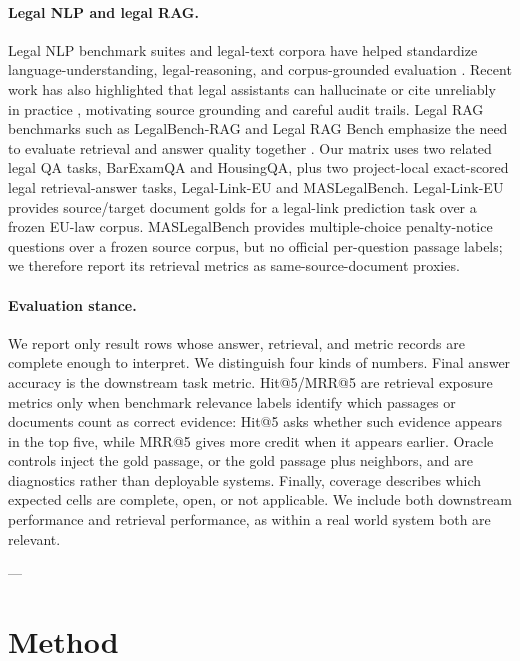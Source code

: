 \paragraph{Legal NLP and legal RAG.}
 Legal NLP benchmark suites and legal-text corpora have helped standardize
language-understanding, legal-reasoning, and corpus-grounded evaluation
\citep{guha2023legalbench,chalkidis2022lexglue,henderson2022pileoflaw}.
Recent work has also highlighted that legal assistants can hallucinate or cite
unreliably in practice \citep{magesh2024hallucinations}, motivating source
grounding and careful audit trails. Legal RAG benchmarks such as LegalBench-RAG
and Legal RAG Bench emphasize the need to evaluate retrieval and answer quality
together \citep{pipitone2024legalbenchrag,butler2026legalragbench}. Our matrix
uses two related legal QA tasks, BarExamQA and HousingQA, plus two project-local
exact-scored legal retrieval-answer tasks, Legal-Link-EU and MASLegalBench.
Legal-Link-EU provides source/target document golds for a legal-link prediction
task over a frozen EU-law corpus. MASLegalBench provides multiple-choice
penalty-notice questions over a frozen source corpus, but no official
per-question passage labels; we therefore report its retrieval metrics as
same-source-document proxies.

\paragraph{Evaluation stance.}
 We report only result rows whose answer, retrieval, and metric records are
complete enough to interpret. We distinguish four kinds of numbers. Final
answer accuracy is the downstream task metric. Hit@5/MRR@5 are retrieval
exposure metrics only when benchmark relevance labels identify which passages
or documents count as correct evidence: Hit@5 asks whether such evidence
appears in the top five, while MRR@5 gives more credit when it appears earlier.
Oracle controls inject the gold passage, or the gold passage plus
neighbors, and are diagnostics rather than deployable systems. Finally,
coverage describes which expected cells are complete, open, or not applicable.
We include both downstream performance and retrieval performance, as within a real world system both are relevant.

---
\section{Method}\label{sec:method}

